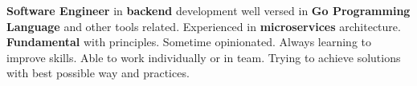 \begin{cvparagraph}

    \textbf{Software Engineer} in \textbf{backend} development well versed in \textbf{Go Programming Language} and other tools related. 
    Experienced in \textbf{microservices} architecture. \textbf{Fundamental} with principles. Sometime opinionated.
    Always learning to improve skills. Able to work individually or in team.
    Trying to achieve solutions with best possible way and practices.
\end{cvparagraph}